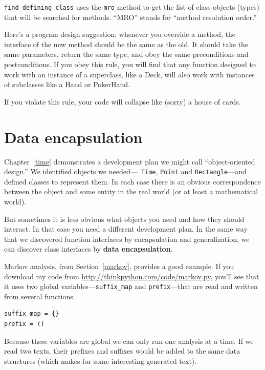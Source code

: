 \documentclass[12pt,a4paper,final,twoside,onecolumn,titlepage]{book}
\begin{document}
\verb"find_defining_class" uses the {\tt mro} method to get the list
of class objects (types) that will be searched for methods.  ``MRO''
stands for ``method resolution order.''

Here's a program design suggestion: whenever you override a method,
the interface of the new method should be the same as the old.  It
should take the same parameters, return the same type, and obey the
same preconditions and postconditions.  If you obey this rule, you
will find that any function designed to work with an instance of a
superclass, like a Deck, will also work with instances of subclasses
like a Hand or PokerHand.

If you violate this rule, your code will collapse like (sorry)
a house of cards.


\section{Data encapsulation}

Chapter~\ref{time} demonstrates a development plan we might call
``object-oriented design.''  We identified objects we needed---{\tt
  Time}, {\tt Point} and {\tt Rectangle}---and defined classes to
represent them.  In each case there is an obvious correspondence
between the object and some entity in the real world (or at least a
mathematical world).

But sometimes it is less obvious what objects you need
and how they should interact.  In that case you need a different
development plan.  In the same way that we discovered function
interfaces by encapsulation and generalization, we can discover
class interfaces by {\bf data encapsulation}.

Markov analysis, from Section~\ref{markov}, provides a good example.
If you download my code from \url{http://thinkpython.com/code/markov.py},
you'll see that it uses two global variables---\verb"suffix_map" and
\verb"prefix"---that are read and written from several functions.

\begin{verbatim}
suffix_map = {}        
prefix = ()            
\end{verbatim}

Because these variables are global
we can only run one analysis
at a time.  If we read two texts, their prefixes and suffixes would
be added to the same data structures (which makes for some interesting
generated text).
\end{document}
